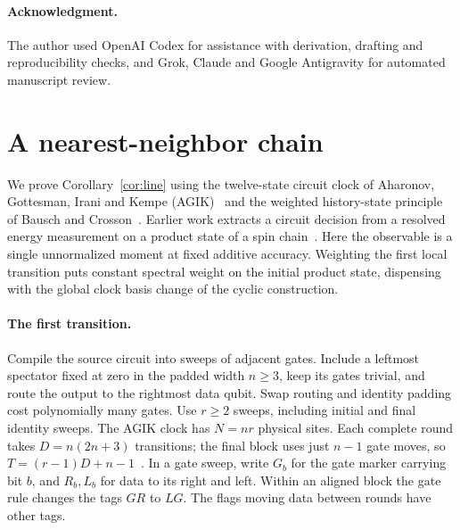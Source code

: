 \documentclass[11pt]{article}
\begin{document}
\paragraph{Acknowledgment.} The author used OpenAI Codex for assistance with derivation, drafting and reproducibility checks, and Grok, Claude and Google Antigravity for automated manuscript review.
\appendix
\section{A nearest-neighbor chain}\label{sec:chain}
We prove Corollary~\ref{cor:line} using the twelve-state circuit clock of Aharonov, Gottesman, Irani and Kempe (AGIK)~\cite[Sec.~2, Fig.~1, Fact~2.2]{agik} and the weighted history-state principle of Bausch and Crosson~\cite[Lemma~4]{bc}. Earlier work extracts a circuit decision from a resolved energy measurement on a product state of a spin chain~\cite{jwz}. Here the observable is a single unnormalized moment at fixed additive accuracy. Weighting the first local transition puts constant spectral weight on the initial product state, dispensing with the global clock basis change of the cyclic construction.

\paragraph{The first transition.}
Compile the source circuit into sweeps of adjacent gates. Include a leftmost spectator fixed at zero in the padded width \(n\ge3\), keep its gates trivial, and route the output to the rightmost data qubit. Swap routing and identity padding cost polynomially many gates. Use \(r\ge2\) sweeps, including initial and final identity sweeps. The AGIK clock has \(N=nr\) physical sites. Each complete round takes \(D=n(2n+3)\) transitions; the final block uses just \(n-1\) gate moves, so \(T=(r-1)D+n-1\)~\cite[Sec.~2, text following Fig.~1]{agik}. In a gate sweep, write \(G_b\) for the gate marker carrying bit \(b\), and \(R_b,L_b\) for data to its right and left. Within an aligned block the gate rule changes the tags \(GR\) to \(LG\). The flags moving data between rounds have other tags.
\end{document}
